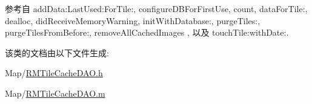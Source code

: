 参考自 add\-Data\-:\-Last\-Used\-:\-For\-Tile\-:, configure\-D\-B\-For\-First\-Use, count, data\-For\-Tile\-:, dealloc, did\-Receive\-Memory\-Warning, init\-With\-Database\-:, purge\-Tiles\-:, purge\-Tiles\-From\-Before\-:, remove\-All\-Cached\-Images , 以及 touch\-Tile\-:with\-Date\-:.



该类的文档由以下文件生成\-:\begin{DoxyCompactItemize}
\item 
Map/\hyperlink{_r_m_tile_cache_d_a_o_8h}{R\-M\-Tile\-Cache\-D\-A\-O.\-h}\item 
Map/\hyperlink{_r_m_tile_cache_d_a_o_8m}{R\-M\-Tile\-Cache\-D\-A\-O.\-m}\end{DoxyCompactItemize}
